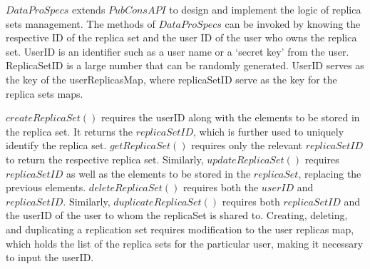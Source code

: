 \documentclass[letterpaper, 10 pt, conference]{ieeeconf}  %
\begin{document}
$DataProSpecs$ extends $PubConsAPI$ to design and implement the logic of replica sets management. The methods of $DataProSpecs$ can be invoked by knowing the respective ID of the replica set and the user ID of the user who owns the replica set. UserID is an identifier such as a user name or a `secret key' from the user. ReplicaSetID is a large number that can be randomly generated. UserID serves as the key of the userReplicasMap, where replicaSetID serve as the key for the replica sets maps.

$createReplicaSet()$ requires the userID along with the elements to be stored in the replica set. It returns the $replicaSetID$, which is further used to uniquely identify the replica set. $getReplicaSet()$ requires only the relevant $replicaSetID$ to return the respective replica set. Similarly, $updateReplicaSet()$ requires $replicaSetID$ as well as the elements to be stored in the $replicaSet$, replacing the previous elements. $deleteReplicaSet()$ requires both the $userID$ and $replicaSetID$. Similarly, $duplicateReplicaSet()$ requires both $replicaSetID$ and the userID of the user to whom the replicaSet is shared to. Creating, deleting, and duplicating a replication set requires modification to the user replicas map, which holds the list of the replica sets for the particular user, making it necessary to input the userID.
	\vspace{-5pt}
\end{document}
